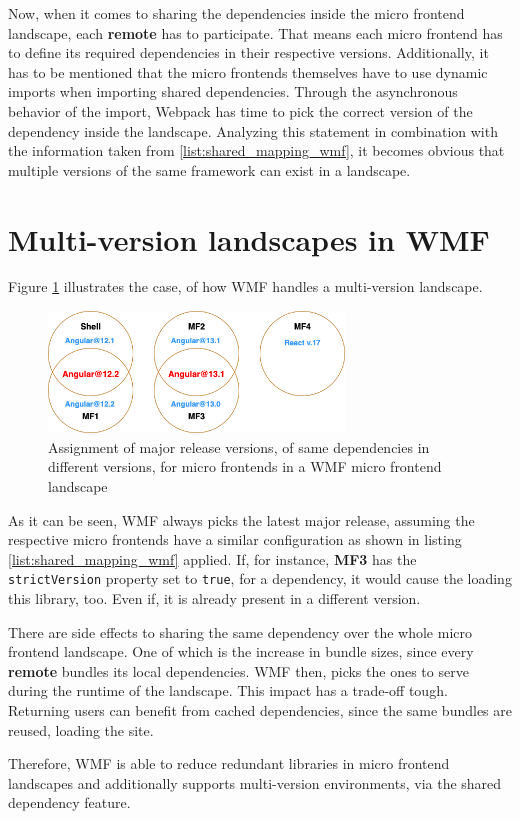 Now, when it comes to sharing the dependencies inside the micro frontend landscape, each \textbf{remote} has to participate. That means each micro frontend has to define its required dependencies in their respective versions. Additionally, it has to be mentioned that the micro frontends themselves have to use dynamic imports when importing shared dependencies. Through the asynchronous behavior of the import, Webpack has time to pick the correct version of the dependency inside the landscape.\cite{wmf_concepts}
Analyzing this statement in combination with the information taken from \ref{list:shared_mapping_wmf}, it becomes obvious that multiple versions of the same framework can exist in a landscape. 

\section{Multi-version landscapes in WMF}

Figure \ref{fig:wmf_multiversions} illustrates the case, of how WMF handles a multi-version landscape.

\begin{figure}[!h]
	\centering
	\includegraphics[width=0.7\textwidth]{Figures/multi_version_diagramm.drawio.png}
	\caption{Assignment of major release versions, of same dependencies in different versions, for micro frontends in a WMF micro frontend landscape}
	\label{fig:wmf_multiversions}
\end{figure}

As it can be seen, WMF always picks the latest major release, assuming the respective micro frontends have a similar configuration as shown in listing \ref{list:shared_mapping_wmf} applied. If, for instance, \textbf{MF3} has the \texttt{strictVersion} property set to \texttt{true}, for a dependency, it would cause the loading this library, too. Even if, it is already present in a different version.

There are side effects to sharing the same dependency over the whole micro frontend landscape. One of which is the increase in bundle sizes, since every \textbf{remote} bundles its local dependencies. WMF then, picks the ones to serve during the runtime of the landscape.
This impact has a trade-off tough. Returning users can benefit from cached dependencies, since the same bundles are reused, loading the site.\cite{wmf_multi_versions}

Therefore, WMF is able to reduce redundant libraries in micro frontend landscapes and additionally supports multi-version environments, via the shared dependency feature.